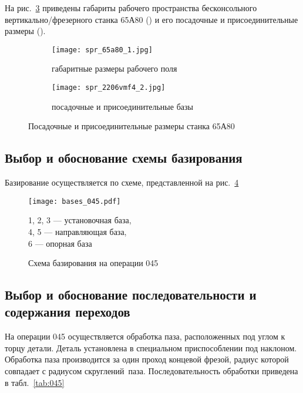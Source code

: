 \documentclass[14pt,russian,a4paper]{extreport}
\begin{document}
На рис.~\ref{fig:65a80} приведены габариты рабочего пространства бесконсольного вертикально\-/фрезерного станка 65А80 () и его посадочные и присоединительные размеры ().

\begin{figure}[H]
	\centering
  \begin{subfigure}[b]{.50\textwidth}
    \centering
    \texttt{[image: spr\_65a80\_1.jpg]}
    \caption{габаритные размеры рабочего поля}
    \label{subfig:65a80a}
  \end{subfigure}%
  \begin{subfigure}[b]{.50\textwidth}
    \centering
    \texttt{[image: spr\_2206vmf4\_2.jpg]}
    \caption{посадочные и присоединительные базы}
    \label{subfig:65a80b}
  \end{subfigure}%
  \caption{Посадочные и присоединительные размеры станка 65А80}
  \label{fig:65a80}
\end{figure}

\newpage
\subsection{Выбор и обоснование схемы базирования}

Базирование осуществляется по схеме, представленной на рис.~\ref{fig:b045}

\begin{figure}[H]
	\centering
	   \texttt{[image: bases\_045.pdf]}
	   \caption{Схема базирования на операции 045}
	   \label{fig:b045}
	   1, 2, 3 --- установочная база, \\
	   4, 5 --- направляющая база, \\
	   6 --- опорная база
\end{figure}

\subsection{Выбор и обоснование последовательности и содержания переходов}

На операции 045 осуществляется обработка паза, расположенных под углом к торцу детали. Деталь установлена в специальном приспособлении под наклоном. Обработка паза производится за один проход концевой фрезой, радиус которой совпадает с радиусом скруглений паза. Последовательность обработки приведена в табл.~\ref{tab:045}
\end{document}
